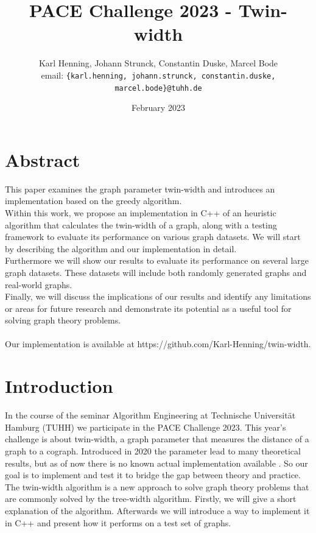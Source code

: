 \documentclass[10pt]{article}
\date{February 2023}
\title{PACE Challenge 2023 - Twin-width}
\author{
    Karl Henning, Johann Strunck, Constantin Duske, Marcel Bode\\
    email: \texttt{\{karl.henning, johann.strunck, constantin.duske, marcel.bode\}@tuhh.de}
}
\begin{document}
\maketitle{}
\section{Abstract}

This paper examines the graph parameter twin-width and introduces an implementation based on the greedy algorithm.\\
Within this work, we propose an implementation in C++ of an heuristic algorithm that calculates the twin-width of a graph, along with a testing framework to evaluate its performance on various graph datasets. We will start by describing the algorithm and our implementation in detail.\\
Furthermore we will show our results to evaluate its performance on several large graph datasets. These datasets will include both randomly generated graphs and real-world graphs.\\
Finally, we will discuss the implications of our results and identify any limitations or areas for future research and demonstrate its potential as a useful tool for solving graph theory problems.\\ \\
Our implementation is available at https://github.com/Karl-Henning/twin-width.

\section{Introduction}


In the course of the seminar Algorithm Engineering at Technische Universität Hamburg (TUHH) we participate in the PACE Challenge 2023.\cite{PACE} This year's challenge is about twin-width, a graph parameter that measures the distance of a graph to a cograph. Introduced in 2020 the parameter lead to many theoretical results, but as
of now there is no known actual implementation available \cite{Bonnet2020,Hlineny2022,Jacob2022}. So our goal is to implement and test it to bridge the gap between theory and practice.\\ The twin-width algorithm is a new approach to
solve graph theory problems that are commonly solved by the tree-width algorithm. Firstly, we will give a short explanation of the algorithm. Afterwards we will introduce a way to implement it in C++ and present how it performs on a test set of graphs.
\end{document}
